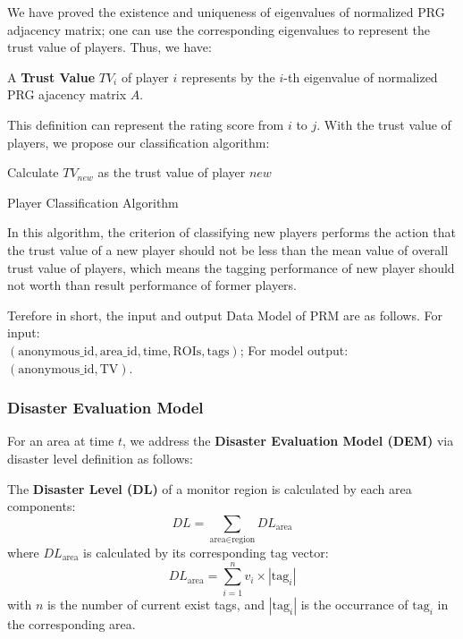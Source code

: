 We have proved the existence and uniqueness of eigenvalues of normalized PRG adjacency matrix; 
one can use the corresponding eigenvalues to represent the trust value of players. Thus, we have:

\begin{definition}
A \textbf{Trust Value} $TV_i$ of player $i$ represents by the $i$-th eigenvalue of normalized PRG ajacency matrix $A$.
\end{definition}

This definition can represent the rating score from $i$ to $j$. With the trust value of players,
we propose our classification algorithm:

\begin{algorithm}[H]
\SetAlgoLined
{}
Calculate $TV_{new}$ as the trust value of player $new$ \;
\caption{Player Classification Algorithm}
\end{algorithm}

In this algorithm, the criterion of classifying new players performs the action that 
the trust value of a new player should not be less than the mean value of overall trust value of players, 
which means the tagging performance of new player should not worth than result performance of former players.

Terefore in short, the input and output Data Model of PRM are as follows. For input:\\
$(\text{anonymous\_id}, \text{area\_id}, \text{time}, \text{ROIs}, \text{tags})$; 
For model output: 
$(\text{anonymous\_id}, \text{TV})$.

\subsubsection{Disaster Evaluation Model}
\label{chapter:dem}

For an area at time $t$, we address the \textbf{Disaster Evaluation Model (DEM)} 
via disaster level definition as follows:

\begin{definition}
\label{def:dl}
The \textbf{Disaster Level (DL)} of a monitor region is calculated by each area components:
\[
  DL = \sum_{\text{area}\in\text{region}}{DL_{\text{area}}}
\]
where $DL_{\text{area}}$ is calculated by its corresponding tag vector:
\[
  DL_{\text{area}} = \sum_{i=1}^{n}{v_i \times |\text{tag}_i|}
\]
with $n$ is the number of current exist tags, and $|\text{tag}_i|$ is the occurrance of $\text{tag}_i$
in the corresponding area.
\end{definition}


